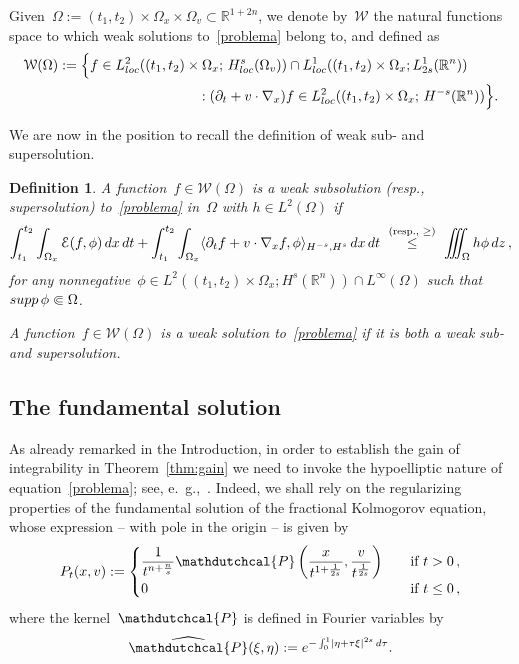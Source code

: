 \documentclass[leqno,10pt]{amsart}
\theoremstyle{plain}
\newtheorem{defn}{Definition}[section]
\theoremstyle{remark}
\numberwithin{equation}{section}
\def\dz{\,{\rm d}z}
\def\dx{\,{\rm d}x}
\def\dt{\,{\rm d}t}
\def \d{\,{\rm d}}
\def\er{\mathbb{R}}
\def\ern{\mathbb{R}^n}
\def\Om{\Omega}
\newcommand{\Ec}{\mathcal{E}}
\newcommand{\Wc}{\mathcal{W}}
\newcommand{\snr}[1]{\lvert #1\rvert}
\begin{document}
{Given~$\Om:=    (t_1,t_2)\times \Om_x \times \Om_v \subset \er^{1+2n}$,  
we denote by~$\Wc$ the natural functions space to which weak solutions to~\eqref{problema} belong to, and defined as
$$
 \begin{aligned}
 \Wc(\Omega) & :=  \Big\{ f \in L^2_{\rm loc}((t_1, t_2)\times \Om_x ;\, H^s_{\rm loc}(\Om_v))\cap L^1_{\rm loc}((t_1, t_2)\times \Om_x ;L^1_{2s}(\ern)) 
 	\\*
    & \qquad\qquad\qquad\qquad \qquad: (\partial_t +v \cdot \nabla_x)f \in L^2_{\rm loc} ((t_1,t_2)\times \Om_x;\,  H^{-s}(\ern )) \Big \}.
 \end{aligned} 
 $$
 

We are now in the position to recall the definition of weak sub- and supersolution.

\begin{defn}\label{def_weak_sol}
A function~$f \in \Wc(\Om)$ is a weak subsolution {\rm (}resp.,
supersolution{\rm)}
to~\eqref{problema} in~$\Om$ with
$h \in L^2(\Om)$ if
\[
\int_{t_1}^{t_2}\int_{\Om_x}\Ec(f,\phi)\dx\dt
+
\int_{t_1}^{t_2}\int_{\Om_x}
\langle \partial_t f+v\cdot\nabla_xf,\phi
\rangle_{H^{-s},H^s}\dx\dt
 \ \stackrel{\text{(resp., }\geq\text{)}}{\leq}  \
\iiint_{\Om}h\phi\dz\,,
\]
for any nonnegative~$\phi\in
L^2((t_1,t_2)\times\Om_x;H^s(\ern)) \cap L^\infty(\Om)$
such that~$
{\rm supp}\,\phi\Subset \Om$.

A function~$f\in\Wc(\Om)$ is a weak solution to~\eqref{problema}
if it is both a weak sub- and supersolution.
\end{defn}


\subsection{The fundamental solution}\label{sec_fondamentale}
As already remarked in the Introduction, in order to establish the gain of integrability in Theorem~\ref{thm:gain} we need to invoke the hypoelliptic nature of equation~\eqref{problema}; see, e.~\!g.,~\cite{HPZ21}. Indeed, we shall rely on the regularizing properties of the fundamental solution of the fractional Kolmogorov equation, whose expression -- with pole in the origin -- is given by
\begin{equation}\label{eq:fundamental}
		P_t(x,v) := 
	\begin{cases}
		\displaystyle \frac{1}{t^{n+\frac{n}{s}}} \mathdutchcal{P}\left(\frac{x}{t^{1+\frac{1}{2s}}}, \frac{v}{t^\frac{1}{2s}}\right) \quad & \text{if}~t>0\,,\\*[0.7ex]
		0 \quad & \text{if}~t \leq 0\,,
	\end{cases}
\end{equation}
where the kernel~$\mathdutchcal{P}$ is defined in Fourier variables by
\[
\widehat{\mathdutchcal{P}}(\xi,\eta) := e^{-\int_0^1 \snr{\eta + \tau\xi}^{2s}\d\tau}.
\]


}
\end{document}
